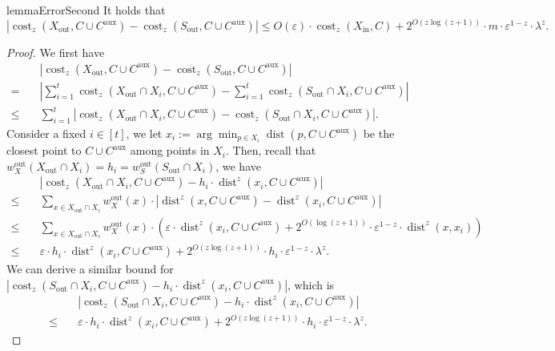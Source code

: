 \documentclass[letterpaper,11pt]{article}
\theoremstyle{plain}
\theoremstyle{definition}
\theoremstyle{remark}
\DeclareMathOperator{\cost}{cost}
\DeclareMathOperator{\dist}{dist}
\newcommand{\inl}{\mathrm{in}}
\newcommand{\out}{\mathrm{out}}
\newcommand{\eps}{\varepsilon}
\newcommand{\aux}{\mathrm{aux}}
\begin{document}
\begin{restatable}{lemma}{ErrorSecond}
    \label{lem:error second}
    It holds that 
    \begin{equation*}
        \left|\cost_z(X_\out,C\cup C^\aux) - \cost_z(S_\out,C\cup C^\aux) \right|\le O(\eps)\cdot \cost_z(X_\inl,C) + 2^{O(z\log(z+1))}\cdot m\cdot \eps^{1-z}\cdot \lambda^z.
    \end{equation*}
\end{restatable}
\begin{proof}
    We first have 
    \begin{align*}
        &\quad \left|\cost_z(X_\out,C\cup C^\aux) - \cost_z(S_\out,C\cup C^\aux) \right|\\
        =&\quad \left|\sum_{i=1}^t \cost_z(X_\out\cap X_i, C\cup C^\aux) - \sum_{i=1}^t\cost_z(S_\out\cap X_i, C\cup C^\aux) \right|\\
        \le&\quad \sum_{i=1}^t\left|\cost_z(X_\out\cap X_i, C\cup C^\aux) - \cost_z(S_\out\cap X_i, C\cup C^\aux)\right|.
    \end{align*}
    Consider a fixed $i\in[t]$, we let $x_i:=\arg\min_{p\in X_i}\dist(p,C\cup C^\aux)$ be the closest point to $C\cup C^\aux$ among points in $X_i$. Then, recall that $w_X^\out(X_\out\cap X_i) = h_i = w_{S}^\out(S_\out\cap X_i)$, we have 
    \begin{align*}
        &\quad\left|\cost_z(X_\out\cap X_i,C\cup C^\aux) - h_i\cdot \dist^z(x_i,C\cup C^\aux) \right|\\
        \le&\quad \sum_{x\in X_\out\cap X_i} w_X^\out(x)\cdot \left| \dist^z(x,C\cup C^\aux) - \dist^z(x_i,C\cup C^\aux) \right|\\
        \le&\quad \sum_{x\in X_\out\cap X_i}w_X^\out(x)\cdot\left(\eps\cdot \dist^z(x_i,C\cup C^\aux) + 2^{O(\log(z+1))}\cdot \eps^{1-z}\cdot \dist^z(x,x_i) \right)\\
        \le&\quad \eps\cdot h_i\cdot \dist^z(x_i,C\cup C^\aux) + 2^{O(z\log(z+1))}\cdot h_i\cdot \eps^{1-z}\cdot \lambda^z.
    \end{align*}  
    We can derive a similar bound for $\left|\cost_z(S_\out\cap X_i,C\cup C^\aux) - h_i\cdot \dist^z(x_i,C\cup C^\aux) \right|$, which is 
    \begin{align*}
        &\quad \left|\cost_z(S_\out\cap X_i,C\cup C^\aux) - h_i\cdot \dist^z(x_i,C\cup C^\aux) \right|\\
        \le&\quad \eps\cdot h_i\cdot \dist^z(x_i,C\cup C^\aux) + 2^{O(z\log(z+1))}\cdot h_i\cdot \eps^{1-z}\cdot \lambda^z.

\end{align*}
\end{proof}
\end{document}
